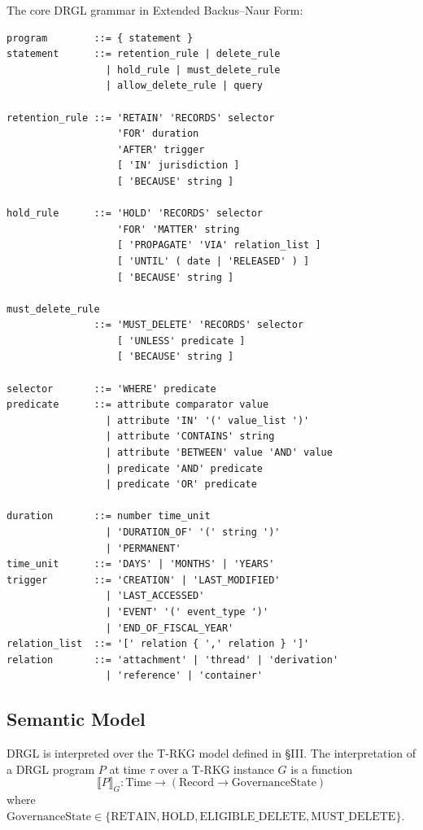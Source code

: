 \documentclass{ieeeaccess}
\begin{document}
The core DRGL grammar in Extended Backus--Naur Form:

\begin{lstlisting}[language=drgl,basicstyle=\ttfamily\footnotesize]
program        ::= { statement }
statement      ::= retention_rule | delete_rule
                 | hold_rule | must_delete_rule
                 | allow_delete_rule | query

retention_rule ::= 'RETAIN' 'RECORDS' selector
                   'FOR' duration
                   'AFTER' trigger
                   [ 'IN' jurisdiction ]
                   [ 'BECAUSE' string ]

hold_rule      ::= 'HOLD' 'RECORDS' selector
                   'FOR' 'MATTER' string
                   [ 'PROPAGATE' 'VIA' relation_list ]
                   [ 'UNTIL' ( date | 'RELEASED' ) ]
                   [ 'BECAUSE' string ]

must_delete_rule
               ::= 'MUST_DELETE' 'RECORDS' selector
                   [ 'UNLESS' predicate ]
                   [ 'BECAUSE' string ]

selector       ::= 'WHERE' predicate
predicate      ::= attribute comparator value
                 | attribute 'IN' '(' value_list ')'
                 | attribute 'CONTAINS' string
                 | attribute 'BETWEEN' value 'AND' value
                 | predicate 'AND' predicate
                 | predicate 'OR' predicate

duration       ::= number time_unit
                 | 'DURATION_OF' '(' string ')'
                 | 'PERMANENT'
time_unit      ::= 'DAYS' | 'MONTHS' | 'YEARS'
trigger        ::= 'CREATION' | 'LAST_MODIFIED'
                 | 'LAST_ACCESSED'
                 | 'EVENT' '(' event_type ')'
                 | 'END_OF_FISCAL_YEAR'
relation_list  ::= '[' relation { ',' relation } ']'
relation       ::= 'attachment' | 'thread' | 'derivation'
                 | 'reference' | 'container'
\end{lstlisting}

\subsection{Semantic Model}

DRGL is interpreted over the T-RKG model defined in §III. The interpretation of a DRGL program $P$ at time $\tau$ over a T-RKG instance $G$ is a function
\[
\llbracket P \rrbracket_G : \mathrm{Time} \to (\mathrm{Record} \to \mathrm{GovernanceState})
\]
where $\mathrm{GovernanceState} \in \{\mathrm{RETAIN}, \mathrm{HOLD}, \mathrm{ELIGIBLE\_DELETE}, \mathrm{MUST\_DELETE}\}$.
\end{document}

